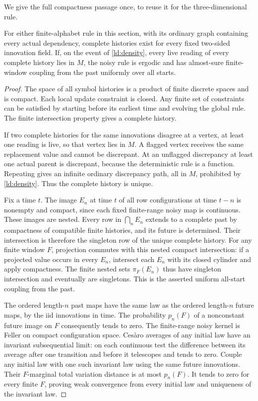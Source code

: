 We give the full compactness passage once, to reuse it for the three-dimensional rule.
\begin{lemma}\label{ld:cftp}
For either finite-alphabet rule in this section, with its ordinary graph containing every actual dependency, complete histories exist for every fixed two-sided innovation field. If, on the event of \cref{ld:density}, every live reading of every complete history lies in $M$, the noisy rule is ergodic and has almost-sure finite-window coupling from the past uniformly over all starts.
\end{lemma}
\begin{proof}
The space of all symbol histories is a product of finite discrete spaces and is compact. Each local update constraint is closed. Any finite set of constraints can be satisfied by starting before its earliest time and evolving the global rule. The finite intersection property gives a complete history.

If two complete histories for the same innovations disagree at a vertex, at least one reading is live, so that vertex lies in $M$. A flagged vertex receives the same replacement value and cannot be discrepant. At an unflagged discrepancy at least one actual parent is discrepant, because the deterministic rule is a function. Repeating gives an infinite ordinary discrepancy path, all in $M$, prohibited by \cref{ld:density}. Thus the complete history is unique.

Fix a time $t$. The image $E_n$ at time $t$ of all row configurations at time $t-n$ is nonempty and compact, since each fixed finite-range noisy map is continuous. These images are nested. Every row in $\bigcap_n E_n$ extends to a complete past by compactness of compatible finite histories, and its future is determined. Their intersection is therefore the singleton row of the unique complete history. For any finite window $F$, projection commutes with this nested compact intersection: if a projected value occurs in every $E_n$, intersect each $E_n$ with its closed cylinder and apply compactness. The finite nested sets $\pi_F(E_n)$ thus have singleton intersection and eventually are singletons. This is the asserted uniform all-start coupling from the past.

The ordered length-$n$ past maps have the same law as the ordered length-$n$ future maps, by the iid innovations in time. The probability $p_n(F)$ of a nonconstant future image on $F$ consequently tends to zero. The finite-range noisy kernel is Feller on compact configuration space. Ces\`aro averages of any initial law have an invariant subsequential limit: on each continuous test the difference between its average after one transition and before it telescopes and tends to zero. Couple any initial law with one such invariant law using the same future innovations. Their $F$-marginal total variation distance is at most $p_n(F)$. It tends to zero for every finite $F$, proving weak convergence from every initial law and uniqueness of the invariant law.
\end{proof}

